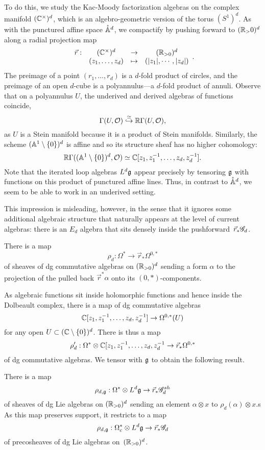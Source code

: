 To do this, we study the Kac-Moody factorization algebras on the complex manifold $(\CC^\times)^d$, 
which is an algebro-geometric version of the torus $(S^1)^{d}$.  
As with the punctured affine space $\pAA^d$, we compactify by pushing forward to $(\RR_>0)^d$ along a radial projection map
\[
\begin{array}{cccc}
\vec{r} : & (\CC^\times)^d & \to & (\RR_{>0})^d\\
& (z_1,\ldots,z_d) & \mapsto & (|z_1|, \cdots, |z_d|)
\end{array}.
\]
The preimage of a point $(r_1,\ldots,r_d)$ is a $d$-fold product of circles, and
the preimage of an open $d$-cube is a polyannulus---a $d$-fold product of annuli.
Observe that on a polyannulus $U$, the underived and derived algebras of functions coincide,
\[
\Gamma(U, \cO) \overset{\simeq}{\hookrightarrow} \RR\Gamma(U,\cO),
\]
as $U$ is a Stein manifold because it is a product of Stein manifolds.
Similarly, the scheme $(\AA^1 \setminus \{0\})^d$ is affine and so its structure sheaf has no higher cohomology:
\[
\RR\Gamma((\AA^1 \setminus \{0\})^d,\cO) \simeq \CC[z_1, z_1^{-1}, \ldots, z_d,z_d^{-1}].
\]
Note that the iterated loop algebras $L^d \fg$ appear precisely by tensoring $\fg$ with functions on this product of punctured affine lines.
Thus, in contrast to $\pAA^d$, we seem to be able to work in an underived setting.

This impression is misleading, however, in the sense that it ignores some additional algebraic structure that naturally appears at the level of current algebras:
there is an $E_d$ algebra that sits densely inside the pushforward~$\vec{r}_* \sG_d$.

\begin{lem}
There is a map 
\[
\rho_{d}: \Omega^*  \to \vec{r}_* \Omega^{0,*}
\]
of sheaves of dg commutative algebras on $(\RR_{>0})^d$ sending a form $\alpha$ to the projection of the pulled back $\vec{r}^* \alpha$ onto its $(0,*)$-components.
\end{lem}

As algebraic functions sit inside holomorphic functions and hence inside the Dolbeault complex,
there is a map of dg commutative algebras
\[
\CC[z_1, z_1^{-1}, \ldots, z_d,z_d^{-1}] \to \Omega^{0,*}(U)
\]
for any open $U \subset (\CC\setminus\{0\})^d$.
There is thus a map 
\[
\rho_{d}': \Omega^* \otimes \CC[z_1, z_1^{-1}, \ldots, z_d,z_d^{-1} \to \vec{r}_* \Omega^{0,*}
\]
of dg commutative algebras.
We tensor with $\fg$ to obtain the following result.

\begin{lem}
There is a map
\[
\rho_{d,\fg}: \Omega^* \otimes L^d\fg \to \vec{r}_* \sG_d^{sh}
\]
of sheaves of dg Lie algebras on $(\RR_{>0})^d$ sending an element $\alpha \otimes x$ to $\rho_d(\alpha) \otimes x$.s
As this map preserves support, it restricts to a map  
\[
\rho_{d,\fg}: \Omega^*_c \otimes L^d\fg \to \vec{r}_* \sG_d
\]
of precosheaves of dg Lie algebras on~$(\RR_{>0})^d$.
\end{lem}

